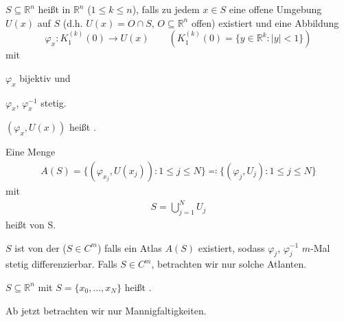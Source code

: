 \documentclass[a4paper,10pt]{scrbook}
\begin{document}
\begin{theorem}[Definition] \label{thm:9.1}
  \begin{enum-arab}
    \item $S \subseteq \mathbb{R}^n$ heißt  in $\mathbb{R}^n$ ($1 \leq k \leq n$), falls zu jedem $x \in S$ eine offene Umgebung $U(x)$ auf $S$ (d.h. $U(x) = O \cap S$, $O \subseteq \mathbb{R}^n$ offen) existiert und eine Abbildung \[ \varphi_x : K_1^{(k)}(0) \to U(x) \qquad \left( K_1^{(k)}(0) = \{ y \in \mathbb{R}^k : |y| < 1 \} \right) \] mit
    \begin{enum-alph}
      \item $\varphi_x$ bijektiv und
      \item $\varphi_x$, $\varphi_x^{-1}$ stetig.
    \end{enum-alph}
    $(\varphi_x,U(x))$ heißt .

    \item Eine Menge
    \begin{align*}
      A(S) = \{ (\varphi_{x_j},U(x_j)) : 1 \leq j \leq N \} \eqcolon \{ (\varphi_j,U_j) : 1 \leq j \leq N \}
    \end{align*}
    mit
    \begin{align*}
      S = \bigcup\limits_{j=1}^{N} U_j
    \end{align*}
    heißt  von S.

    \item $S$ ist von der  ($S \in C^m$) falls ein Atlas $A(S)$ existiert, sodass $\varphi_j$, $\varphi_j^{-1}$ $m$-Mal stetig differenzierbar. Falls $S \in C^m$, betrachten wir nur solche Atlanten.

    \item $S \subseteq \mathbb{R}^n$ mit $S = \{ x_0,\ldots,x_N \}$ heißt  .
  \end{enum-arab}
\end{theorem}

\begin{theorem}[Vereinbarung] \label{thm:9.2}
  Ab jetzt betrachten wir nur Mannigfaltigkeiten.
\end{theorem}
\end{document}
